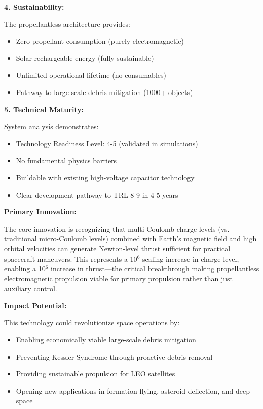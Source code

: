 \documentclass[12pt,a4paper]{article}
\begin{document}
\textbf{4. Sustainability:}

The propellantless architecture provides:
\begin{itemize}
\item Zero propellant consumption (purely electromagnetic)
\item Solar-rechargeable energy (fully sustainable)
\item Unlimited operational lifetime (no consumables)
\item Pathway to large-scale debris mitigation (1000+ objects)
\end{itemize}

\textbf{5. Technical Maturity:}

System analysis demonstrates:
\begin{itemize}
\item Technology Readiness Level: 4-5 (validated in simulations)
\item No fundamental physics barriers
\item Buildable with existing high-voltage capacitor technology
\item Clear development pathway to TRL 8-9 in 4-5 years
\end{itemize}

\textbf{Primary Innovation:}

The core innovation is recognizing that multi-Coulomb charge levels (vs. traditional micro-Coulomb levels) combined with Earth's magnetic field and high orbital velocities can generate Newton-level thrust sufficient for practical spacecraft maneuvers. This represents a 10$^6$ scaling increase in charge level, enabling a 10$^6$ increase in thrust—the critical breakthrough making propellantless electromagnetic propulsion viable for primary propulsion rather than just auxiliary control.

\textbf{Impact Potential:}

This technology could revolutionize space operations by:
\begin{itemize}
\item Enabling economically viable large-scale debris mitigation
\item Preventing Kessler Syndrome through proactive debris removal
\item Providing sustainable propulsion for LEO satellites
\item Opening new applications in formation flying, asteroid deflection, and deep space
\end{itemize}
\end{document}
